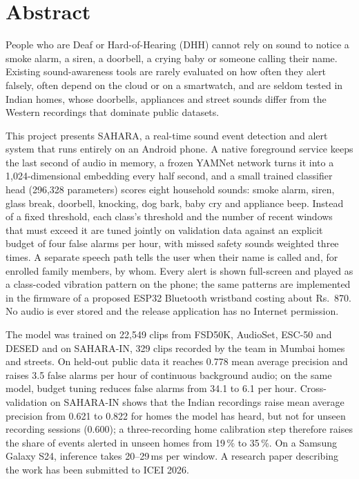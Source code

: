 \documentclass[12pt,a4paper,oneside]{report}
\begin{document}
\chapter*{Abstract}
People who are Deaf or Hard-of-Hearing (DHH) cannot rely on sound to notice a smoke alarm, a siren, a doorbell, a crying baby or someone calling their name. Existing sound-awareness tools are rarely evaluated on how often they alert falsely, often depend on the cloud or on a smartwatch, and are seldom tested in Indian homes, whose doorbells, appliances and street sounds differ from the Western recordings that dominate public datasets.

This project presents SAHARA, a real-time sound event detection and alert system that runs entirely on an Android phone. A native foreground service keeps the last second of audio in memory, a frozen YAMNet network turns it into a 1,024-dimensional embedding every half second, and a small trained classifier head (296,328 parameters) scores eight household sounds: smoke alarm, siren, glass break, doorbell, knocking, dog bark, baby cry and appliance beep. Instead of a fixed threshold, each class's threshold and the number of recent windows that must exceed it are tuned jointly on validation data against an explicit budget of four false alarms per hour, with missed safety sounds weighted three times. A separate speech path tells the user when their name is called and, for enrolled family members, by whom. Every alert is shown full-screen and played as a class-coded vibration pattern on the phone; the same patterns are implemented in the firmware of a proposed ESP32 Bluetooth wristband costing about Rs.~870. No audio is ever stored and the release application has no Internet permission.

The model was trained on 22,549 clips from FSD50K, AudioSet, ESC-50 and DESED and on SAHARA-IN, 329 clips recorded by the team in Mumbai homes and streets. On held-out public data it reaches 0.778 mean average precision and raises 3.5 false alarms per hour of continuous background audio; on the same model, budget tuning reduces false alarms from 34.1 to 6.1 per hour. Cross-validation on SAHARA-IN shows that the Indian recordings raise mean average precision from 0.621 to 0.822 for homes the model has heard, but not for unseen recording sessions (0.600); a three-recording home calibration step therefore raises the share of events alerted in unseen homes from 19\,\% to 35\,\%. On a Samsung Galaxy S24, inference takes 20--29\,ms per window. A research paper describing the work has been submitted to ICEI 2026.
\end{document}
